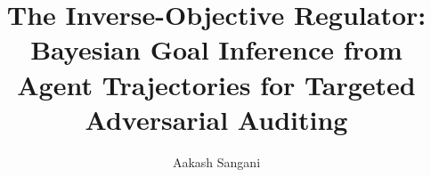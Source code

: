 \documentclass[11pt]{article}
\title{The Inverse-Objective Regulator: Bayesian Goal Inference from\\
Agent Trajectories for Targeted Adversarial Auditing}
\author{Aakash Sangani}
\date{}
\begin{document}
\maketitle

\begin{abstract}

\end{abstract}














\end{document}
